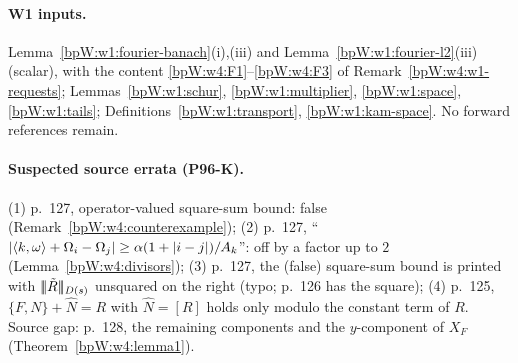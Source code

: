 \paragraph{W1 inputs.} Lemma~\ref{bpW:w1:fourier-banach}(i),(iii) and Lemma~\ref{bpW:w1:fourier-l2}(iii) (scalar), with the
content \ref{bpW:w4:F1}--\ref{bpW:w4:F3} of Remark~\ref{bpW:w4:w1-requests}; Lemmas~\ref{bpW:w1:schur},
\ref{bpW:w1:multiplier}, \ref{bpW:w1:space}, \ref{bpW:w1:tails}; Definitions~\ref{bpW:w1:transport},
\ref{bpW:w1:kam-space}. No forward references remain.

\paragraph{Suspected source errata (P96-K).} (1) p.~127, operator-valued square-sum bound: false
(Remark~\ref{bpW:w4:counterexample}); (2) p.~127, ``$\lvert \langle k,\omega\rangle+\Omega_i-\Omega_j\rvert\ge\alpha(1+\lvert i-j\rvert)/A_k$'': off by a
factor up to $2$ (Lemma~\ref{bpW:w4:divisors}); (3) p.~127, the (false) square-sum bound is printed with
$\lvert \!\lvert \!\lvert \tilde R\rvert\!\rvert\!\rvert_{D(s)}$ unsquared on the right (typo; p.~126 has the square); (4) p.~125, $\{F,N\}+\hat N=R$ with $\hat N=[R]$
holds only modulo the constant term of $R$. Source gap: p.~128, the remaining components and the $y$-component of
$X_F$ (Theorem~\ref{bpW:w4:lemma1}).
